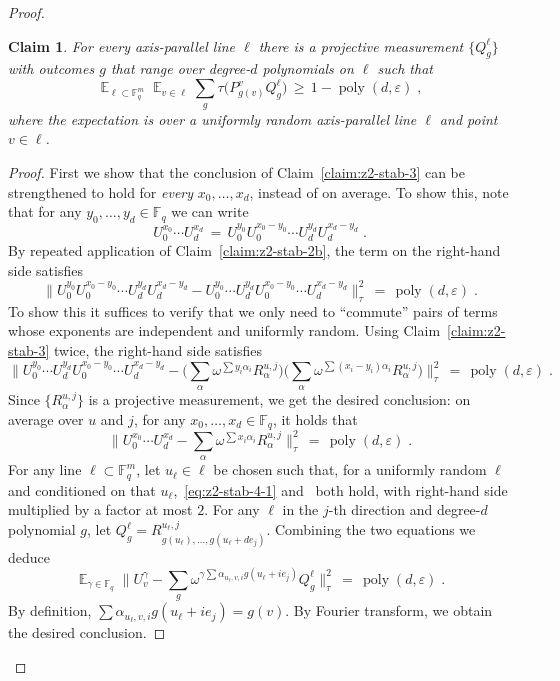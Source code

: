 \documentclass[11pt]{article}
\newtheorem{claim}[theorem]{Claim}
\theoremstyle{definition}
\DeclareMathOperator*{\Expectation}{\mathbb{E}}
\newcommand{\Es}[1]{\Expectation_{#1}}
\newcommand{\F}{\ensuremath{\mathbb{F}}}
\DeclareMathOperator{\poly}{poly}
\newcommand{\eps}{\varepsilon}
\begin{document}
\begin{proof}
\begin{claim}\label{claim:z2-stab-4}
For every axis-parallel line $\ell$ there is a projective measurement $\{Q^\ell_g\}$ with outcomes $g$ that range over degree-$d$ polynomials on $\ell$ such that
\[ \Es{\ell\subset \F_q^m} \Es{v\in \ell} \sum_g \tau\big( P^v_{g(v)} Q^\ell_g\big) \,\geq\, 1-\poly(d,\eps)\;, \]
where the expectation is over a uniformly random axis-parallel line $\ell$ and point $v\in \ell$. 
\end{claim}

\begin{proof}
First we show that the conclusion of Claim~\ref{claim:z2-stab-3} can be strengthened to hold for \emph{every} $x_0,\ldots,x_{d}$, instead of on average. To show this, note that for any $y_0,\ldots,y_d\in \F_q$ we can write 
\[ U_0^{x_0}\cdots U_d^{x_d}\,=\, U_0^{y_0}U_0^{x_0-y_0}\cdots U_d^{y_d}U_d^{x_d-y_d}\;.\]
By repeated application of Claim~\ref{claim:z2-stab-2b}, the term on the right-hand side satisfies 
\[ \big\| U_0^{y_0}U_0^{x_0-y_0}\cdots U_d^{y_d}U_d^{x_d-y_d}  - U_0^{y_0}\cdots U_d^{y_d}U_0^{x_0-y_0}\cdots U_d^{x_d-y_d}\big\|_\tau^2 \,=\,\poly(d,\eps)\;.\]
To show this it suffices to verify that we only need to ``commute'' pairs of terms whose exponents are independent and uniformly random. Using Claim~\ref{claim:z2-stab-3} twice, the right-hand side satisfies
\[ \big\| U_0^{y_0}\cdots U_d^{y_d}U_0^{x_0-y_0}\cdots U_d^{x_d-y_d} - \Big(\sum_{\alpha} \omega^{\sum y_i\alpha_i} R^{u,j}_\alpha\Big)\Big(\sum_{\alpha} \omega^{\sum (x_i-y_i)\alpha_i} R^{u,j}_\alpha\Big) \big\|_\tau^2 \,=\,\poly(d,\eps)\;.\]
Since $\{R^{u,j}_\alpha\}$ is a projective measurement, we get the desired conclusion: on average over $u$ and $j$, for any $x_0,\ldots,x_d\in\F_q$, it holds that 
\begin{equation}\label{eq:z2-stab-4-1}
 \Big\| U_0^{x_0}\cdots U_d^{x_d} -  \sum_{\alpha} \omega^{\sum x_i\alpha_i} R^{u,j}_\alpha\Big\|_\tau^2 \,=\, \poly(d,\eps)\;.
	\end{equation}
	For any line $\ell \subset \F_q^m$, let $u_\ell\in \ell$ be chosen such that, for a uniformly random $\ell$ and conditioned on that $u_\ell$,~\eqref{eq:z2-stab-4-1} and~\label{eq:z2-stab-5-0} both hold, with right-hand side multiplied by a factor at most $2$. For any $\ell$ in the $j$-th direction and degree-$d$ polynomial $g$, let $Q^\ell_g = R^{u_\ell,j}_{g(u_\ell),\ldots,g(u_\ell+de_j)}$.
	Combining the two equations we deduce
	\begin{equation}\label{eq:z2-stab-4-2}
 \Es{\gamma\in\F_q} \Big\| U_v^\gamma -  \sum_{g} \omega^{\gamma \sum \alpha_{u_\ell,v,i} g(u_\ell+ie_j)} Q^{\ell}_g\Big\|_\tau^2 \,=\, \poly(d,\eps)\;.
	\end{equation}
	By definition, $\sum \alpha_{u_\ell,v,i} g(u_\ell+ie_j) = g(v)$. By Fourier transform, we obtain the desired conclusion. 
\end{proof}



\end{proof}
\end{document}
